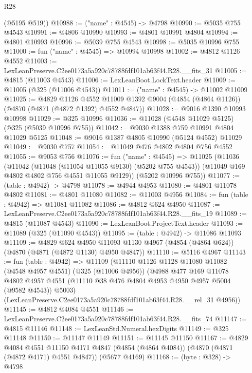 \begin{lexlean}{R28}
\begin{coremodule}
      (@5195 @519))
@10988 := ("name" : @4545) -> @4798
@10990 := @5035 @755 @4543
@10991 := @4806 @10990
@10993 := @4801 @10991 @4804
@10994 := @4801 @10993
@10996 := @5039 @755 @4543
@10998 := @5035 @10996 @755
@11000 := fun ("name" : @4545) => @10994 @10998
@11002 := @4812 @1126 @4552
@11003 := LexLeanPreserve.C2ee0173a5a920c78788fdf101ab63f44.R28.__fits_31
@11005 := @4815 (@11003 @4543)
@11006 := LexLeanBoot.LockText.header
@11009 := @11005 (@325 (@11006 @4543))
@11011 := ("name" : @4545) -> @11002 @11009
@11025 := @4829
    @1126
    @4552
    @11009
    @1392
    @9004
    (@4854 (@4864 @1126))
    (@4870 (@4871 (@4872 @1392) @4552 @4847))
@11028 := @9016 @1390 @10993 @10998
@11029 := @325 @10996
@11036 := @11028 (@4548 @11029 @5125) (@325 (@5039 @10996 @755))
@11042 := @9030 @1388 @759 @10991 @4804 @11029 @5125
@11048 := @9016 @1387 @4805 @10990 (@5124 @4552) @11029
@11049 := @9030 @757
@11054 := @11049 @476 @4802 @4804 @756 @4552
@11055 := @9053 @756
@11076 := fun ("name" : @4545) =>
  @11025
    (@11036
      (@11042
        (@11048 (@11054 @11055 @9130) (@5202 @755 @4543))
        (@11049 @169 @4802 @4802 @756 @4551 @11055 @9129))
      (@5202 @10996 @755))
@11077 := (table : @4942) -> @4798
@11078 := @4944 @4953
@11080 := @4801 @11078 @4802
@11081 := @4801 @11080
@11082 := @11003 @4956
@11084 := fun (table : @4942) => @11081 @11082
@11086 := @4812 @624 @4950
@11087 := LexLeanPreserve.C2ee0173a5a920c78788fdf101ab63f44.R28.__fits_19
@11089 := @4815 (@11087 @4543)
@11090 := LexLeanBoot.ProjectText.header
@11093 := @11089 (@325 (@11090 @4543))
@11095 := (table : @4942) -> @11086 @11093
@11109 := @4829
    @624
    @4950
    @11093
    @1130
    @4967
    (@4854 (@4864 @624))
    (@4870 (@4871 (@4872 @1130) @4950 @4847))
@11110 := @5116 @4967
@11143 := fun (table : @4942) =>
  @11109
    (@11110
      @1126
      @1128
      @11080
      @11082
      (@4548 @4957 @4551)
      (@325 (@11006 @4956))
      (@4988
        @477
        @169
        @11078
        @4802
        @4957
        @4551
        (@11110 @38 @476 @4804 @4953 @4950 @4957 @5004 (@9582 @4543))
        @5003)
      (LexLeanPreserve.C2ee0173a5a920c78788fdf101ab63f44.R28.__rel_31 @4956))
@11145 := @4812 @4084 @4551
@11146 := LexLeanPreserve.C2ee0173a5a920c78788fdf101ab63f44.R28.__fits_74
@11147 := @4815 @11146
@11148 := LexLeanStd.Numeral.hexDigits
@11149 := @325 @11148
@11150 := @11147 @11149
@11151 := @11145 @11150
@11167 := @4829
    @4084
    @4551
    @11150
    @4171
    @4847
    (@4854 (@4864 @4084))
    (@4870 (@4871 (@4872 @4171) @4551 @4847))
    (@5677 @4169)
@11168 := (byte : @328) -> @4798

\end{coremodule}
\end{lexlean}
